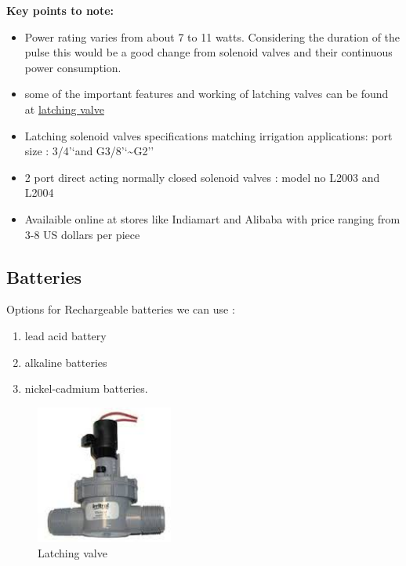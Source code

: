 \documentclass[16pt]{article}
\begin{document}
  \textbf{Key points to note:}

  \begin{itemize}

  \item
    Power rating varies from about 7 to 11 watts. Considering the duration
    of the pulse this would be a good change from solenoid valves and
    their continuous power consumption.
  \item
    some of the important features and working of latching valves can be
    found at {\color{red}\href{www.giplindia.com/latching-solenoid-valve.htm}{latching valve}}  
    
  \item
    Latching solenoid valves specifications matching irrigation
    applications: port size : 3/4'`and G3/8'`\textasciitilde{}G2''
  \item
    2 port direct acting normally closed solenoid valves : model no L2003
    and L2004
  \item
    Availaible online at stores like Indiamart and Alibaba with price
    ranging from 3-8 US dollars per piece
  \end{itemize}
  


\hfill




\subsection{Batteries}

\hfill


Options for Rechargeable batteries we can use :
\hfill

\begin{enumerate}

\item
  lead acid battery
\item
  alkaline batteries
\item
  nickel-cadmium batteries.
\end{enumerate}

\hfill

\begin{figure}
\hspace{3cm}
\includegraphics[width=0.4\textwidth]{images/latch_valve.jpg}
\caption{Latching valve}
\end{figure}
\vspace{0.4cm}
\end{document}
